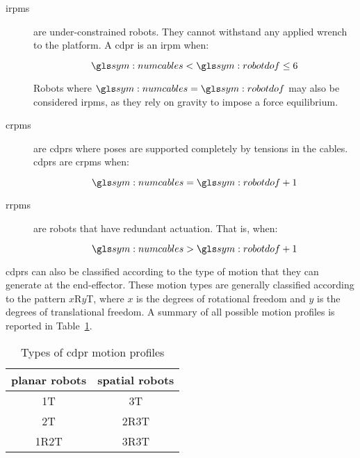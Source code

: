         \begin{description}

            \item[\glspl{irpm}]

				are under-constrained robots.  They cannot withstand any applied
				wrench to the platform.  A \gls{cdpr}  is  an  \gls{irpm}  when:

                \begin{equation}
                    \numcables < \robotdof \leq 6
                \end{equation}

				Robots where $\numcables = \robotdof$  may	also  be  considered
				\glspl{irpm},  as  they  rely  on  gravity	to	impose	a  force
                equilibrium.

            \item[\glspl{crpm}]

				are  \glspl{cdpr}  where  poses  are  supported  completely   by
				tensions in the cables.   \glspl{cdpr}	are  \glspl{crpm}  when:

                \begin{equation}
                    \numcables = \robotdof + 1
                \end{equation}

            \item[\glspl{rrpm}]

				are robots	that  have	redundant  actuation.	That  is,  when:

                \begin{equation}
                    \numcables > \robotdof + 1
                \end{equation}
        \end{description}

		\glspl{cdpr} can also be classified according to the type of motion that
		they can generate at the end-effector.	These motion types are generally
		classified according to the pattern $x$R$y$T, where $x$ is	the  degrees
        of rotational freedom and $y$ is the degrees of translational freedom. A
		summary   of   all	 possible	motion	 profiles	is	  reported	  in
        Table~\ref{tab:types_of_cdpr_motion_profiles}.

        \begin{table}[ht]
            \centering
            \begin{tabular}{c c}
                \toprule
                planar robots & spatial robots \\
                \midrule
                1T          &   3T \\
                2T          &   2R3T \\
                1R2T        &   3R3T
            \end{tabular}
            \caption{Types of \gls{cdpr} motion profiles}%
            \label{tab:types_of_cdpr_motion_profiles}
        \end{table}

